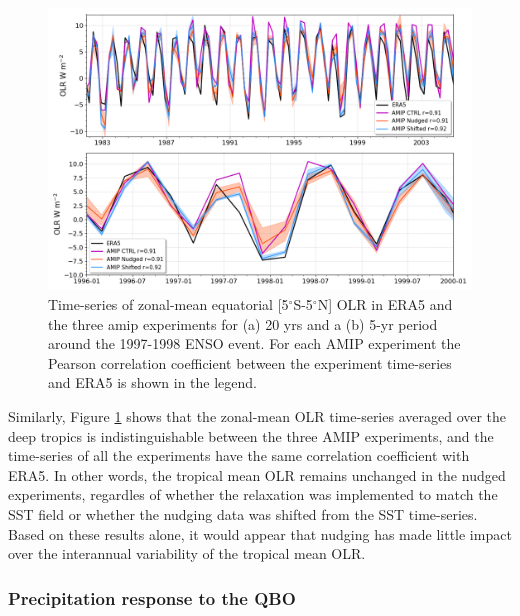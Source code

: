 \begin{figure}[b!]
\centering
 \includegraphics[width=\linewidth]{figures/olr_tseries.png}
\caption[Tropical mean OLR time series.]{Time-series of zonal-mean equatorial [5$^\circ$S-5$^\circ$N]  OLR in ERA5 and the three amip experiments for (a) 20 yrs and a (b) 5-yr period around the 1997-1998 ENSO event. For each AMIP experiment the Pearson correlation coefficient between the experiment time-series and ERA5 is shown in the legend. }
\label{fig:olramip_tseries}
\end{figure}



Similarly, Figure \ref{fig:olramip_tseries} shows that the zonal-mean OLR time-series averaged over the deep tropics is indistinguishable between the three AMIP experiments, and the time-series of all the experiments have the same correlation coefficient with ERA5. In other words, the tropical mean OLR remains unchanged in the nudged experiments, regardles of whether the relaxation was implemented to match the SST field or whether the nudging data was shifted from the SST time-series. 
Based on these results alone, it would appear that nudging has made little impact over the interannual variability of the tropical mean OLR. 


\subsubsection{Precipitation response to the QBO}

